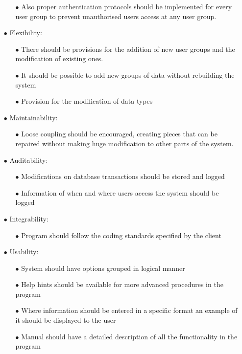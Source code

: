 \documentclass[a4paper,12pt]{article}
\begin{document}
\begin{itemize}
\begin{itemize}
	 	\item[$\bullet$]Also proper authentication protocols should be implemented for every user group to prevent unauthorised users access at any user group.
	 \end{itemize}
 	\item[$\bullet$]Flexibility: 
  	\begin{itemize}
  		\item[$\bullet$]There should be provisions for the addition of new user groups and the modification of existing ones.
	 	\item[$\bullet$]It should be possible to add new groups of data without rebuilding the system
	 	\item[$\bullet$]Provision for the modification of data types 
	 \end{itemize}
	 \item[$\bullet$]Maintainability: 
  	\begin{itemize}
	 	\item[$\bullet$]Loose coupling should be encouraged, creating pieces that can be repaired without making huge modification to other parts of the system. 
	 \end{itemize}
 		 \item[$\bullet$]Auditability:
  	\begin{itemize}
  		\item[$\bullet$]Modifications on database transactions should be stored and logged
	 	\item[$\bullet$]Information of when and where users access the system should be logged
	 \end{itemize}
 	\item[$\bullet$]Integrability:
  	\begin{itemize}
	  	\item[$\bullet$]Program should follow the coding standards specified by the client
	 \end{itemize}
 	\item[$\bullet$]Usability:
  	\begin{itemize}
 		\item[$\bullet$]System should have options grouped in logical manner
	 	\item[$\bullet$]Help hints should be available for more advanced  procedures in the program
	 	\item[$\bullet$]Where information should be entered in a specific format an example of it should be displayed to the user
 	\item[$\bullet$]Manual should have a detailed description of all the functionality in the program
	 \end{itemize}
 	 \end{itemize}
\end{document}
